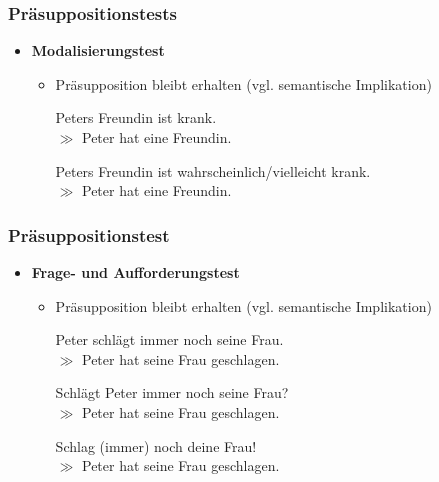 
\begin{frame}
\frametitle{Präsuppositionstests}

\begin{itemize}
	\item \textbf{Modalisierungstest}
	
	\begin{itemize}
		\item Präsupposition bleibt erhalten (vgl. semantische Implikation)

		\ea Peters Freundin ist krank.\\ $\gg$ Peter hat eine Freundin.
		\z
		
		\ea Peters Freundin ist wahrscheinlich/vielleicht krank.\\ $\gg$ Peter hat eine Freundin.
		\z
	
	\end{itemize}
	
\end{itemize}

\end{frame}



\begin{frame}
\frametitle{Präsuppositionstest}

\begin{itemize}
	\item \textbf{Frage- und Aufforderungstest}
	
	\begin{itemize}
		\item Präsupposition bleibt erhalten (vgl. semantische Implikation)

		\ea Peter schlägt immer noch seine Frau.\\ $\gg$ Peter hat seine Frau geschlagen.
		\z
		
		\ea Schlägt Peter immer noch seine Frau?\\ $\gg$ Peter hat seine Frau geschlagen.
		\z
		
		\ea Schlag (immer) noch deine Frau!\\ $\gg$ Peter hat seine Frau geschlagen.
		\z
		
		\end{itemize}

\end{itemize}

\end{frame}


